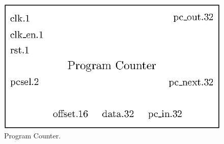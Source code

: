\begin{figure}[H]
    \centering
    \includegraphics[scale=0.8]{Chapter3-CPU/res/pc}
    \caption{Program Counter.}
    \label{fig:components/pc}
\end{figure}

